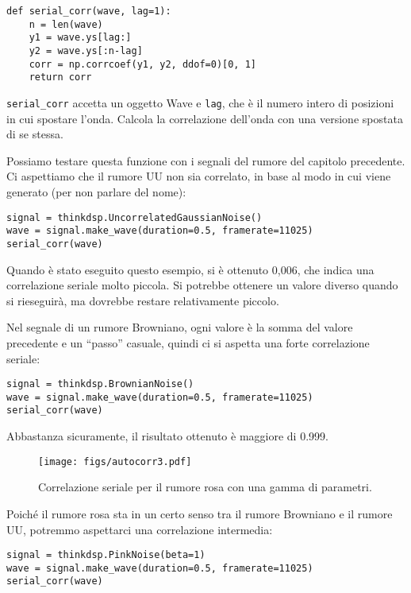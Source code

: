 \documentclass[12pt]{book} \usepackage[width=5.5in,height=8.5in, hmarginratio=3:2,vmarginratio=1:1]{geometry}
\begin{document}
\begin{verbatim} 
def serial_corr(wave, lag=1):
    n = len(wave)
    y1 = wave.ys[lag:]
    y2 = wave.ys[:n-lag]
    corr = np.corrcoef(y1, y2, ddof=0)[0, 1]
    return corr
 \end{verbatim} 

\verb"serial_corr" accetta un oggetto Wave e {\tt lag}, che è il numero intero di posizioni in cui spostare l'onda. Calcola la correlazione dell'onda con una versione spostata di se stessa.

Possiamo testare questa funzione con i segnali del rumore del capitolo precedente. Ci aspettiamo che il rumore UU non sia correlato, in base al modo in cui viene generato (per non parlare del nome):

\begin{verbatim} 
signal = thinkdsp.UncorrelatedGaussianNoise()
wave = signal.make_wave(duration=0.5, framerate=11025)
serial_corr(wave)
 \end{verbatim} 

Quando è stato eseguito questo esempio, si è ottenuto 0,006, che indica una correlazione seriale molto piccola. Si potrebbe ottenere un valore diverso quando si rieseguirà, ma dovrebbe restare relativamente piccolo.

Nel segnale di un rumore Browniano, ogni valore è la somma del valore precedente e un ``passo'' casuale, quindi ci si aspetta una forte correlazione seriale:

\begin{verbatim} 
signal = thinkdsp.BrownianNoise()
wave = signal.make_wave(duration=0.5, framerate=11025)
serial_corr(wave)
 \end{verbatim} 

Abbastanza sicuramente, il risultato ottenuto è maggiore di 0.999.

\begin{figure} 

\centerline{\texttt{[image: figs/autocorr3.pdf]}} \caption{Correlazione seriale per il rumore rosa con una gamma di parametri.} \label{fig.autocorr3} \end{figure} 

Poiché il rumore rosa sta in un certo senso tra il rumore Browniano e il rumore UU, potremmo aspettarci una correlazione intermedia:

\begin{verbatim} 
signal = thinkdsp.PinkNoise(beta=1)
wave = signal.make_wave(duration=0.5, framerate=11025)
serial_corr(wave)
 \end{verbatim} 
\end{document}
